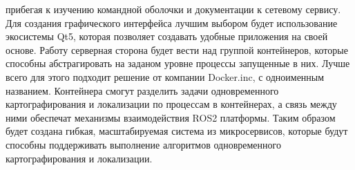 \documentclass[a4paper, 14pt]{extreport}
\begin{document}
 прибегая к изучению командной оболочки и документации к сетевому сервису. Для создания графического интерфейса лучшим выбором 
 будет использование экосистемы Qt5, которая позволяет создавать удобные приложения на своей основе. Работу серверная сторона будет 
 вести над группой контейнеров, которые способны абстрагировать на заданом уровне процессы запущенные в них. Лучше всего для этого 
 подходит решение от компании Docker.inc, с одноименным названием. Контейнера смогут разделить задачи одновременного картографирования 
 и локализации по процессам в контейнерах, а связь между ними обеспечат механизмы взаимодействия ROS2 платформы. Таким образом будет
 создана гибкая, масштабируемая система из микросервисов, которые будут способны поддерживать выполнение алгоритмов одновременного 
 картографирования и локализации.   
\end{document}
